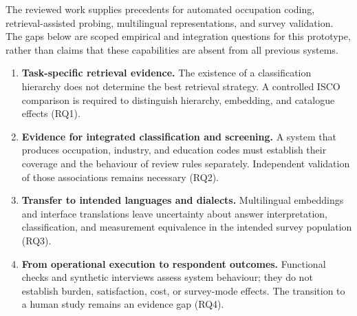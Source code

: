 The reviewed work supplies precedents for automated occupation coding,
retrieval-assisted probing, multilingual representations, and survey
validation. The gaps below are scoped empirical and integration questions
for this prototype, rather than claims that these capabilities are absent
from all previous systems.

\begin{enumerate}[label=\textbf{G\arabic*.}, leftmargin=2.5em]
  \item \textbf{Task-specific retrieval evidence.} The existence of a
  classification hierarchy does not determine the best retrieval strategy.
  A controlled ISCO comparison is required to distinguish hierarchy,
  embedding, and catalogue effects (RQ1).

  \item \textbf{Evidence for integrated classification and screening.}
  A system that produces occupation, industry, and education codes must
  establish their coverage and the behaviour of review rules separately.
  Independent validation of those associations remains necessary (RQ2).

  \item \textbf{Transfer to intended languages and dialects.} Multilingual
  embeddings and interface translations leave uncertainty about answer
  interpretation, classification, and measurement equivalence in the
  intended survey population (RQ3).

  \item \textbf{From operational execution to respondent outcomes.}
  Functional checks and synthetic interviews assess system behaviour;
  they do not establish burden, satisfaction, cost, or survey-mode effects.
  The transition to a human study remains an evidence gap (RQ4).
\end{enumerate}

